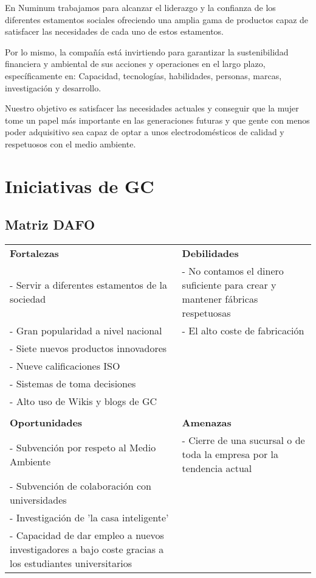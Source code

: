 \documentclass[a4paper]{article}
\begin{document}
En Numinum trabajamos para alcanzar el liderazgo y la confianza de los diferentes estamentos sociales ofreciendo una amplia gama de productos capaz de satisfacer las necesidades de cada uno de estos estamentos.

Por lo mismo, la compañía está invirtiendo para garantizar la sustenibilidad financiera y ambiental de sus acciones y operaciones en el largo plazo, específicamente en: Capacidad, tecnologías, habilidades, personas, marcas, investigación y desarrollo.

Nuestro objetivo es satisfacer las necesidades actuales y conseguir que la mujer tome un papel más importante en las generaciones futuras y que gente con menos poder adquisitivo sea capaz de optar a unos electrodomésticos de calidad y respetuosos con el medio ambiente.
\newpage


\section{Iniciativas de GC}

\subsection{Matriz DAFO}

\begin{table}[ht!]
	\centering
	\begin{tabular}{ p{6cm} | p{6cm} }
		\textbf{Fortalezas} & \textbf{Debilidades}\\
		- Servir a diferentes estamentos de la sociedad & - No contamos el dinero suficiente para crear y mantener fábricas respetuosas \\
		- Gran popularidad a nivel nacional & - El alto coste de fabricación  \\
		- Siete nuevos productos innovadores & \\
		- Nueve calificaciones ISO & \\
		- Sistemas de toma decisiones & \\
		- Alto uso de Wikis y blogs de GC & \\\hline\\
		\textbf{Oportunidades} & \textbf{Amenazas} \\
		- Subvención por respeto al Medio Ambiente & - Cierre de una sucursal o de toda la empresa por la tendencia actual\\
		- Subvención de colaboración con universidades & \\
		- Investigación de 'la casa inteligente' & \\
		- Capacidad de dar empleo a nuevos investigadores a bajo coste gracias a los estudiantes universitarios 
	\end{tabular}
\end{table}
\end{document}
